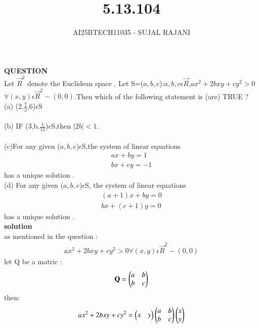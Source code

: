 \documentclass[journal,12pt,onecolumn]{IEEEtran}
\begin{document}
\title{5.13.104}
\author{AI25BTECH11035 - SUJAL RAJANI}
{\let\newpage\relax\maketitle}
\textbf{QUESTION}
\\
Let $\vec{R}^2$ denote the Euclidean space . Let S={($a,b,c$):$a,b,c$$\epsilon$$\vec{R}$,$ax^2+2bxy+cy^2>0$$\forall(x,y)\epsilon\vec{R}^2-{(0,0)}$}.Then which of the following statement is (are) TRUE ?
\\
  (a) (2,$\frac{7}{2}$,6)$\epsilon$S
  \\
  \\
  (b) IF (3,b,$\frac{1}{12}$)$\epsilon$S,then $|2b|<1 $.
  \\
  \\
  (c)For any given ($a,b,c$)$\epsilon$S,the system of linear equations 
  \begin{align*}
      ax+by=1
      \\
      bx+cy=-1
  \end{align*}
  has a unique solution .
  \\
  (d) For any given ($a,b,c$)$\epsilon$S, the system of linear equations 
  \begin{align*}
      (a+1)x+by=0
      \\
      bx+(c+1)y=0
  \end{align*}
  has a unique solution .
  \\
\textbf{solution}
\\
as mentioned in the question :
\\
\begin{align*}
    ax^2+2bxy+cy^2>0\forall(x,y)\epsilon\vec{R}^2-{(0,0)}
\end{align*}
let Q be a matric :
\begin{align*}
    \mathbf{Q}=\begin{pmatrix}a&b\\b&c\end{pmatrix}
\end{align*}
then:
\begin{align*}
    ax^2+2bxy+cy^2=\begin{pmatrix}x&y\end{pmatrix}\begin{pmatrix}a&b\\b&c\end{pmatrix}\begin{pmatrix}x\\y\end{pmatrix}
\end{align*}
\end{document}
